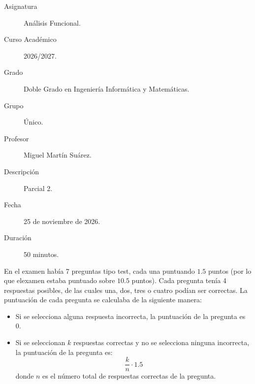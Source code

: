 \documentclass[12pt]{article}
\begin{document}

    
    

    \begin{description}
        \item[Asignatura] Análisis Funcional.
        \item[Curso Académico] 2026/2027.
        \item[Grado] Doble Grado en Ingeniería Informática y Matemáticas.
        \item[Grupo] Único.
        \item[Profesor] Miguel Martín Suárez.
        \item[Descripción] Parcial 2.
        \item[Fecha] 25 de noviembre de 2026.
        \item[Duración] 50 minutos.
    
    \end{description}
    \newpage



En el examen había 7 preguntas tipo test, cada una puntuando $1.5$ puntos (por lo que elexamen estaba puntuado sobre $10.5$ puntos). Cada pregunta tenía 4 respuestas posibles, de las cuales una, dos, tres o cuatro podían ser correctas. La puntuación de cada pregunta se calculaba de la siguiente manera:
\begin{itemize}
    \item Si se selecciona alguna respuesta incorrecta, la puntuación de la pregunta es 0.
    \item Si se seleccionan $k$ respuestas correctas y no se selecciona ninguna incorrecta, la puntuación de la pregunta es:
    \begin{equation*}
        \frac{k}{n} \cdot 1.5
    \end{equation*}
    donde $n$ es el número total de respuestas correctas de la pregunta.
\end{itemize}
\end{document}
